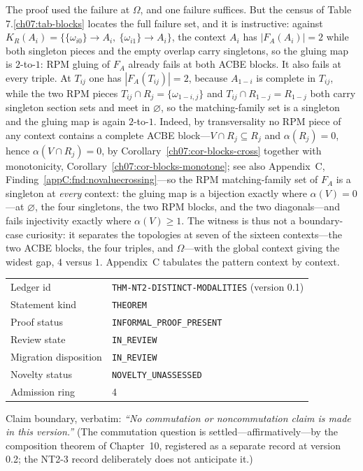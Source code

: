 \begin{remark}\label{ch09:rem-other-failures}
The proof used the failure at $\Omega$, and one failure suffices. But the census of Table 7.\ref{ch07:tab-blocks} locates the full failure set, and it is instructive: against $K_{R}(A_{i})=\{\{\omega_{i0}\}\to A_{i},\ \{\omega_{i1}\}\to A_{i}\}$, the context $A_{i}$ has $|F_{A}(A_{i})|=2$ while both singleton pieces and the empty overlap carry singletons, so the gluing map is $2$-to-$1$: RPM gluing of $F_{A}$ already fails at both ACBE blocks. It also fails at every triple. At $T_{ij}$ one has $|F_{A}(T_{ij})|=2$, because $A_{1-i}$ is complete in $T_{ij}$, while the two RPM pieces $T_{ij}\cap R_{j}=\{\omega_{1-i,j}\}$ and $T_{ij}\cap R_{1-j}=R_{1-j}$ both carry singleton section sets and meet in $\varnothing$, so the matching-family set is a singleton and the gluing map is again $2$-to-$1$. Indeed, by transversality no RPM piece of any context contains a complete ACBE block---$V\cap R_{j}\subseteq R_{j}$ and $\alpha(R_{j})=0$, hence $\alpha(V\cap R_{j})=0$, by Corollary~\ref{ch07:cor-blocks-cross} together with monotonicity, Corollary~\ref{ch07:cor-blocks-monotone}; see also Appendix~C, Finding~\ref{appC:fnd:novaluecrossing}---so the RPM matching-family set of $F_{A}$ is a singleton at \emph{every} context: the gluing map is a bijection exactly where $\alpha(V)=0$---at $\varnothing$, the four singletons, the two RPM blocks, and the two diagonals---and fails injectivity exactly where $\alpha(V)\ge 1$. The witness is thus not a boundary-case curiosity: it separates the topologies at seven of the sixteen contexts---the two ACBE blocks, the four triples, and $\Omega$---with the global context giving the widest gap, $4$ versus $1$. Appendix~C tabulates the pattern context by context.
\end{remark}

\begin{remark}\label{ch09:rem-ledger-nt23}
\begin{center}
\begin{tabular}{@{}ll@{}}
\toprule
Ledger id & \texttt{THM-NT2-DISTINCT-MODALITIES} (version 0.1) \\
Statement kind & \texttt{THEOREM} \\
Proof status & \texttt{INFORMAL\_PROOF\_PRESENT} \\
Review state & \texttt{IN\_REVIEW} \\
Migration disposition & \texttt{IN\_REVIEW} \\
Novelty status & \texttt{NOVELTY\_UNASSESSED} \\
Admission ring & 4 \\
\bottomrule
\end{tabular}
\end{center}
Claim boundary, verbatim: \emph{``No commutation or noncommutation claim is made in this version.''} (The commutation question is settled---affirmatively---by the composition theorem of Chapter~10, registered as a separate record at version 0.2; the NT2-3 record deliberately does not anticipate it.)
\end{remark}

